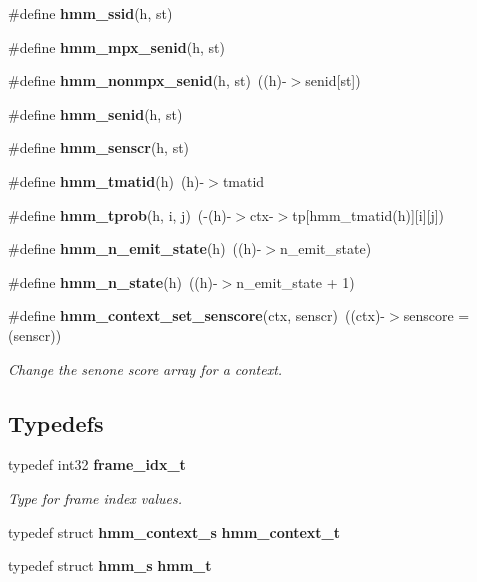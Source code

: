 \begin{DoxyCompactItemize}
\item 
\#define {\bfseries hmm\-\_\-ssid}(h, st)
\item 
\#define {\bfseries hmm\-\_\-mpx\-\_\-senid}(h, st)
\item 
\#define {\bfseries hmm\-\_\-nonmpx\-\_\-senid}(h, st)~((h)-\/$>$senid[st])\label{hmm_8h_a45850600910ae0839f34792b00b5970b}

\item 
\#define {\bfseries hmm\-\_\-senid}(h, st)
\item 
\#define {\bfseries hmm\-\_\-senscr}(h, st)
\item 
\#define {\bfseries hmm\-\_\-tmatid}(h)~(h)-\/$>$tmatid\label{hmm_8h_a749193daefb4247e56dbc6b3f2d75c14}

\item 
\#define {\bfseries hmm\-\_\-tprob}(h, i, j)~(-\/(h)-\/$>$ctx-\/$>$tp[hmm\-\_\-tmatid(h)][i][j])\label{hmm_8h_a3d6e71af2d2ce897e63a5ee8c5741593}

\item 
\#define {\bfseries hmm\-\_\-n\-\_\-emit\-\_\-state}(h)~((h)-\/$>$n\-\_\-emit\-\_\-state)\label{hmm_8h_a4ef324f17daafd4de126b88671c7e93c}

\item 
\#define {\bfseries hmm\-\_\-n\-\_\-state}(h)~((h)-\/$>$n\-\_\-emit\-\_\-state + 1)\label{hmm_8h_a16311c1d64310ad3a8af33eec0fbe9f1}

\item 
\#define {\bf hmm\-\_\-context\-\_\-set\-\_\-senscore}(ctx, senscr)~((ctx)-\/$>$senscore = (senscr))\label{hmm_8h_a44d0b5515cb269bf9b95f62aada18cbb}

\begin{DoxyCompactList}\small\item\em Change the senone score array for a context. \end{DoxyCompactList}\end{DoxyCompactItemize}
\subsection*{Typedefs}
\begin{DoxyCompactItemize}
\item 
typedef int32 {\bf frame\-\_\-idx\-\_\-t}
\begin{DoxyCompactList}\small\item\em Type for frame index values. \end{DoxyCompactList}\item 
typedef struct {\bf hmm\-\_\-context\-\_\-s} {\bfseries hmm\-\_\-context\-\_\-t}\label{hmm_8h_a87dd8e0478af63326664232541d2ade6}

\item 
typedef struct {\bf hmm\-\_\-s} {\bfseries hmm\-\_\-t}\label{hmm_8h_a6f69b65f5fd63aa882fbe6002be74c13}

\end{DoxyCompactItemize}
